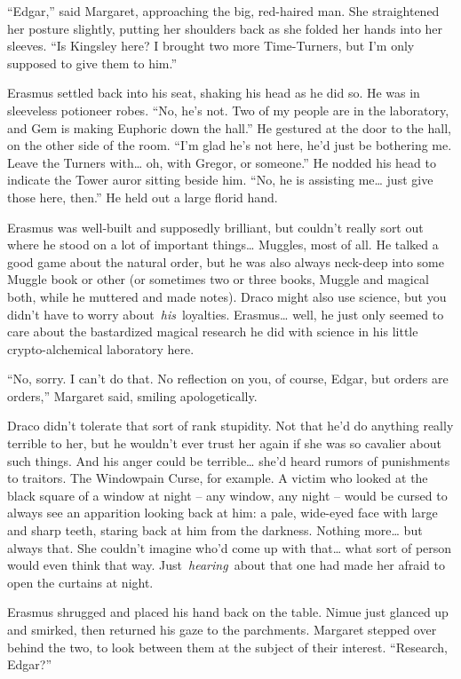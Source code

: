 ``Edgar,'' said Margaret, approaching the big, red-haired man. She
straightened her posture slightly, putting her shoulders back as she
folded her hands into her sleeves. ``Is Kingsley here? I brought two
more Time-Turners, but I'm only supposed to give them to him.''

Erasmus settled back into his seat, shaking his head as he did so. He
was in sleeveless potioneer robes. ``No, he's not. Two of my people are
in the laboratory, and Gem is making Euphoric down the hall.'' He
gestured at the door to the hall, on the other side of the room. ``I'm
glad he's not here, he'd just be bothering me. Leave the Turners
with\ldots{} oh, with Gregor, or someone.'' He nodded his head to
indicate the Tower auror sitting beside him. ``No, he is assisting
me\ldots{} just give those here, then.'' He held out a large florid
hand.

Erasmus was well-built and supposedly brilliant, but couldn't really
sort out where he stood on a lot of important things\ldots{} Muggles,
most of all. He talked a good game about the natural order, but he was
also always neck-deep into some Muggle book or other (or sometimes two
or three books, Muggle and magical both, while he muttered and made
notes). Draco might also use science, but you didn't have to worry
about~\emph{his}~loyalties. Erasmus\ldots{} well, he just only seemed to
care about the bastardized magical research he did with science in his
little crypto-alchemical laboratory here.

``No, sorry. I can't do that. No reflection on you, of course, Edgar,
but orders are orders,'' Margaret said, smiling apologetically.

Draco didn't tolerate that sort of rank stupidity. Not that he'd do
anything really terrible to her, but he wouldn't ever trust her again if
she was so cavalier about such things. And his anger could be
terrible\ldots{} she'd heard rumors of punishments to traitors. The
Windowpain Curse, for example. A victim who looked at the black square
of a window at night -- any window, any night -- would be cursed to
always see an apparition looking back at him: a pale, wide-eyed face
with large and sharp teeth, staring back at him from the darkness.
Nothing more\ldots{} but always that. She couldn't imagine who'd come up
with that\ldots{} what sort of person would even think that way.
Just~\emph{hearing}~about that one had made her afraid to open the
curtains at night.

Erasmus shrugged and placed his hand back on the table. Nimue just
glanced up and smirked, then returned his gaze to the parchments.
Margaret stepped over behind the two, to look between them at the
subject of their interest. ``Research, Edgar?''

